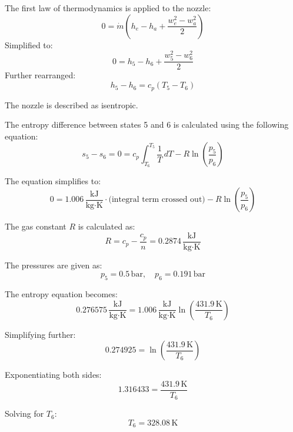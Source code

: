 The first law of thermodynamics is applied to the nozzle:  
\[
0 = \dot{m} \left( h_e - h_a + \frac{w_e^2 - w_a^2}{2} \right)
\]
Simplified to:  
\[
0 = h_5 - h_6 + \frac{w_5^2 - w_6^2}{2}
\]  
Further rearranged:  
\[
h_5 - h_6 = c_p (T_5 - T_6)
\]  

The nozzle is described as isentropic.

The entropy difference between states 5 and 6 is calculated using the following equation:  
\[
s_5 - s_6 = 0 = c_p \int_{T_6}^{T_5} \frac{1}{T} \, dT - R \ln \left( \frac{p_5}{p_6} \right)
\]  

The equation simplifies to:  
\[
0 = 1.006 \, \frac{\text{kJ}}{\text{kg·K}} \cdot \text{(integral term crossed out)} - R \ln \left( \frac{p_5}{p_6} \right)
\]  

The gas constant \( R \) is calculated as:  
\[
R = c_p - \frac{c_p}{n} = 0.2874 \, \frac{\text{kJ}}{\text{kg·K}}
\]  

The pressures are given as:  
\[
p_5 = 0.5 \, \text{bar}, \quad p_6 = 0.191 \, \text{bar}
\]  

The entropy equation becomes:  
\[
0.276575 \, \frac{\text{kJ}}{\text{kg·K}} = 1.006 \, \frac{\text{kJ}}{\text{kg·K}} \ln \left( \frac{431.9 \, \text{K}}{T_6} \right)
\]  

Simplifying further:  
\[
0.274925 = \ln \left( \frac{431.9 \, \text{K}}{T_6} \right)
\]  

Exponentiating both sides:  
\[
1.316433 = \frac{431.9 \, \text{K}}{T_6}
\]  

Solving for \( T_6 \):  
\[
T_6 = 328.08 \, \text{K}
\]